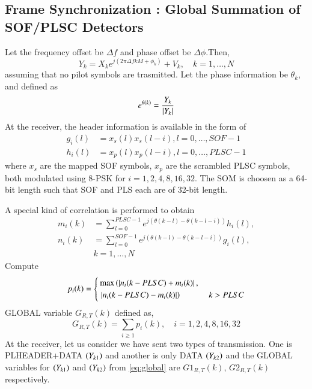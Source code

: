 \subsection{Frame Synchronization : Global Summation of SOF/PLSC Detectors} 
%
%
Let the frequency offset be $\Delta f$ and phase offset be $\Delta \phi$.Then,
\begin{equation}
Y_k= X_k e^{j(2\pi\Delta fkM+\phi_k)} + V_k, \quad k = 1,\dots,N 
\end{equation}
%
assuming that no pilot symbols are trasmitted. 
Let the phase information be $\theta_k$, and defined as
%
\begin{equation}
e^{\theta(k)} = \frac{Y_k}{\left\vert Y_k\right\vert}
\end{equation}
%
At the receiver, the header information is available in the form of 
\begin{align}
g_i(l)&=x_s(l)x_s(l-i), l = 0,\dots, SOF-1
\\
h_i(l)&=x_p(l)x_p(l-i), l = 0,\dots, PLSC-1
\end{align}
%
where $x_s$ are the mapped SOF symbols, $x_p$ are the scrambled PLSC  symbols, both  modulated using 8-PSK
for $i=1,2,4,8,16,32$.
The SOM is choosen as a 64-bit length such that SOF and PLS each are of 32-bit length.

A special kind of correlation is performed to obtain
\begin{align}
m_i(k)&=\sum_{l=0}^{PLSC-1} e^{j(\theta(k-l)-\theta(k-l-i))} h_i(l),
\\
n_i(k)&=\sum_{l=0}^{SOF-1} e^{j(\theta(k-l)-\theta(k-l-i))} g_i(l) ,
\\
&k = 1, \dots, N 
\end{align}
%
Compute
\begin{align}
p_i(k)=
\begin{cases}
\max \left(\left\vert n_i({k-PLSC})+m_i(k)\right\vert,\right. &
\\
\left.\left\vert n_i({k-PLSC})-m_i(k)\right\vert\right) & k > PLSC
\end{cases}
\end{align}
 GLOBAL variable $G_{R,T}(k)$  \cite{frame_offset} defined as,
\begin{equation}
G_{R,T}(k)=\sum_{i\geq1}p_i(k) , \quad i=1,2,4,8,16,32
\label{eq:global}
\end{equation}
At the receiver, let us consider we have sent two types of transmission. One is PLHEADER+DATA $\left(Y_{k1}\right)$ and another is only DATA $\left(Y_{k2}\right)$ and the GLOBAL variables for $\left(Y_{k1}\right)$ and $\left(Y_{k2}\right)$ from \eqref{eq:global} are $G1_{R,T}(k)$, $G2_{R,T}(k)$ respectively.
